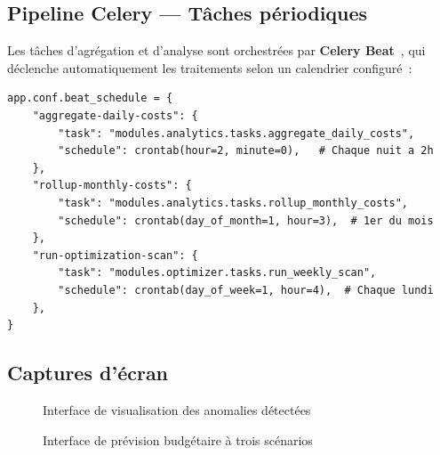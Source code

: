 \subsection{Pipeline Celery --- Tâches périodiques}

Les tâches d'agrégation et d'analyse sont orchestrées par \textbf{Celery Beat}~\cite{celery2024}, qui déclenche automatiquement les traitements selon un calendrier configuré~:

\begin{lstlisting}[language=Python3, caption={Configuration de Celery Beat (celery\_app.py)}]
app.conf.beat_schedule = {
    "aggregate-daily-costs": {
        "task": "modules.analytics.tasks.aggregate_daily_costs",
        "schedule": crontab(hour=2, minute=0),   # Chaque nuit a 2h
    },
    "rollup-monthly-costs": {
        "task": "modules.analytics.tasks.rollup_monthly_costs",
        "schedule": crontab(day_of_month=1, hour=3),  # 1er du mois
    },
    "run-optimization-scan": {
        "task": "modules.optimizer.tasks.run_weekly_scan",
        "schedule": crontab(day_of_week=1, hour=4),  # Chaque lundi
    },
}
\end{lstlisting}


\subsection{Captures d'écran}

\begin{figure}[H]
    \centering
    \caption{Interface de visualisation des anomalies détectées}
    \label{fig:anomalies_ui}
\end{figure}

\begin{figure}[H]
    \centering
    \caption{Interface de prévision budgétaire à trois scénarios}
    \label{fig:forecasting_ui}
\end{figure}

